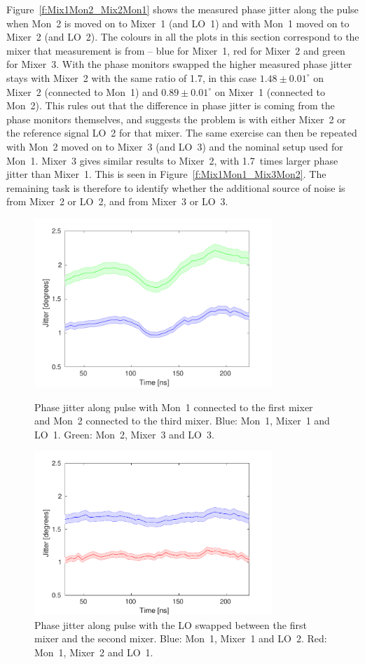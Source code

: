Figure~\ref{f:Mix1Mon2_Mix2Mon1} shows the measured phase jitter along the pulse when Mon~2 is moved on to Mixer~1 (and LO~1) and with Mon~1 moved on to Mixer~2 (and LO~2). The colours in all the plots in this section correspond to the mixer that measurement is from -- blue for Mixer~1, red for Mixer~2 and green for Mixer~3. With the phase monitors swapped the higher measured phase jitter stays with Mixer~2 with the same ratio of 1.7, in this case \(1.48\pm0.01^\circ\) on Mixer~2 (connected to Mon~1) and \(0.89\pm0.01^\circ\) on Mixer~1 (connected to Mon~2). This rules out that the difference in phase jitter is coming from the phase monitors themselves, and suggests the problem is with either Mixer~2 or the reference signal LO~2 for that mixer. The same exercise can then be repeated with Mon~2 moved on to Mixer~3 (and LO~3) and the nominal setup used for Mon~1. Mixer~3 gives similar results to Mixer~2, with 1.7~times larger phase jitter than Mixer~1. This is seen in Figure~\ref{f:Mix1Mon1_Mix3Mon2}. The remaining task is therefore to identify whether the additional source of noise is from Mixer~2 or LO~2, and from Mixer~3 or LO~3.

\begin{figure}
  \centering
  \includegraphics[width=0.8\textwidth]{Figures/phaseMons/Mix1Mon1_Mix3Mon2}
  \caption{Phase jitter along pulse with Mon~1 connected to the first mixer and Mon~2 connected to the third mixer. Blue: Mon~1, Mixer~1 and LO~1. Green: Mon~2, Mixer~3 and LO~3.}
  \label{f:Mix1Mon1_Mix3Mon2}
  \includegraphics[width=0.8\textwidth]{Figures/phaseMons/Mix1Mon1PhShft2_Mix2Mon2PhShft1}
  \caption{Phase jitter along pulse with the LO swapped between the first mixer and the second mixer. Blue: Mon~1, Mixer~1 and LO~2. Red: Mon~1, Mixer~2 and LO~1.}
  \label{f:Mix1Mon1PhShft2_Mix2Mon2PhShft1}
\end{figure}

